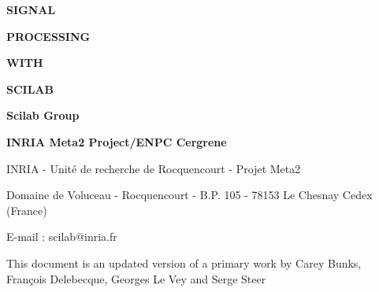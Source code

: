 


\pagestyle{empty}



\newpage

\vspace{8.cm}

{\Huge\bf  {SIGNAL}}

{\Huge\bf  {PROCESSING}}

{\Huge\bf  {WITH}}

{\Huge\bf  {SCILAB}}



\vspace{3.cm}

{\Huge\bf {Scilab Group}}

{\Large\bf
INRIA Meta2 Project/ENPC Cergrene}

\normalsize

\vspace{12.cm}

INRIA - Unit\'e de recherche de Rocquencourt - Projet Meta2

Domaine de Voluceau - Rocquencourt - B.P. 105 - 78153 Le Chesnay Cedex (France)

E-mail : scilab@inria.fr



\normalsize

\newpage


\bigskip
\bigskip

This document is an updated version of a primary work by
Carey Bunks, Fran\c{c}ois Delebecque, Georges Le Vey and Serge Steer



\tableofcontents

\pagestyle{headings}

